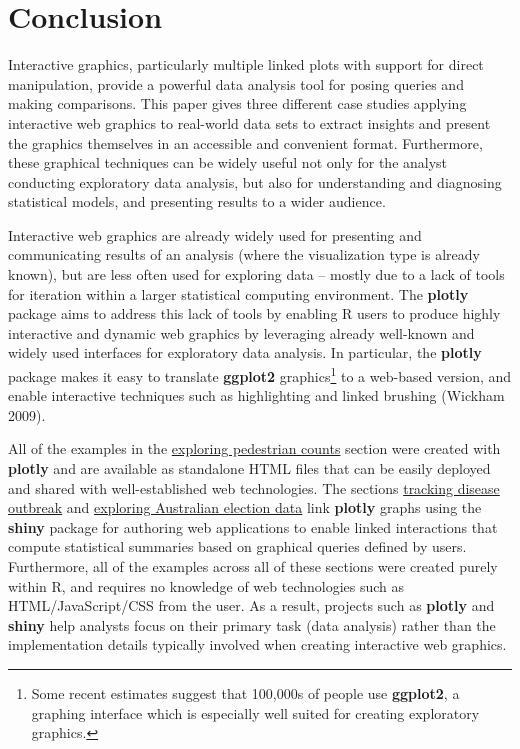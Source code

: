 \documentclass[12pt,]{article}
\let\rmarkdownfootnote\footnote%
\def\footnote{\protect\rmarkdownfootnote}
\theoremstyle{definition}
\theoremstyle{definition}
\theoremstyle{remark}
\begin{document}
\section{Conclusion}\label{conclusion}

Interactive graphics, particularly multiple linked plots with support
for direct manipulation, provide a powerful data analysis tool for
posing queries and making comparisons. This paper gives three different
case studies applying interactive web graphics to real-world data sets
to extract insights and present the graphics themselves in an accessible
and convenient format. Furthermore, these graphical techniques can be
widely useful not only for the analyst conducting exploratory data
analysis, but also for understanding and diagnosing statistical models,
and presenting results to a wider audience.

Interactive web graphics are already widely used for presenting and
communicating results of an analysis (where the visualization type is
already known), but are less often used for exploring data -- mostly due
to a lack of tools for iteration within a larger statistical computing
environment. The \textbf{plotly} package aims to address this lack of
tools by enabling R users to produce highly interactive and dynamic web
graphics by leveraging already well-known and widely used interfaces for
exploratory data analysis. In particular, the \textbf{plotly} package
makes it easy to translate \textbf{ggplot2} graphics\footnote{Some
  recent estimates suggest that 100,000s of people use \textbf{ggplot2},
  a graphing interface which is especially well suited for creating
  exploratory graphics.} to a web-based version, and enable interactive
techniques such as highlighting and linked brushing (Wickham 2009).

All of the examples in the
\protect\hyperlink{exploring-pedestrian-counts}{exploring pedestrian
counts} section were created with \textbf{plotly} and are available as
standalone HTML files that can be easily deployed and shared with
well-established web technologies. The sections
\protect\hyperlink{tracking-disease-outbreak}{tracking disease outbreak}
and \protect\hyperlink{exploring-australian-election-data}{exploring
Australian election data} link \textbf{plotly} graphs using the
\textbf{shiny} package for authoring web applications to enable linked
interactions that compute statistical summaries based on graphical
queries defined by users. Furthermore, all of the examples across all of
these sections were created purely within R, and requires no knowledge
of web technologies such as HTML/JavaScript/CSS from the user. As a
result, projects such as \textbf{plotly} and \textbf{shiny} help
analysts focus on their primary task (data analysis) rather than the
implementation details typically involved when creating interactive web
graphics.
\end{document}

